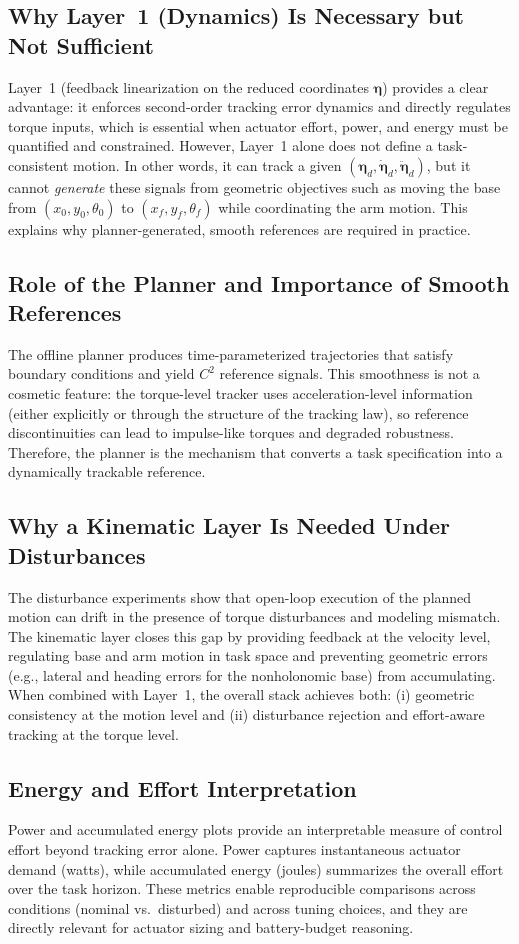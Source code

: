 \documentclass[conference]{IEEEtran}
\newcommand{\etav}{\bm{\eta}}
\newcommand{\etavdot}{\dot{\bm{\eta}}}
\newcommand{\etavddot}{\ddot{\bm{\eta}}}
\begin{document}
\subsection{Why Layer~1 (Dynamics) Is Necessary but Not Sufficient}
Layer~1 (feedback linearization on the reduced coordinates $\etav$) provides a
clear advantage: it enforces second-order tracking error dynamics and directly
regulates torque inputs, which is essential when actuator effort, power, and
energy must be quantified and constrained. However, Layer~1 alone does not
define a task-consistent motion. In other words, it can track a given
$(\etav_d,\etavdot_d,\etavddot_d)$, but it cannot \emph{generate} these signals
from geometric objectives such as moving the base from $(x_0,y_0,\theta_0)$ to
$(x_f,y_f,\theta_f)$ while coordinating the arm motion. This explains why
planner-generated, smooth references are required in practice.

\subsection{Role of the Planner and Importance of Smooth References}
The offline planner produces time-parameterized trajectories that satisfy
boundary conditions and yield $C^2$ reference signals. This smoothness is not a
cosmetic feature: the torque-level tracker uses acceleration-level information
(either explicitly or through the structure of the tracking law), so reference
discontinuities can lead to impulse-like torques and degraded robustness.
Therefore, the planner is the mechanism that converts a task specification into
a dynamically trackable reference.

\subsection{Why a Kinematic Layer Is Needed Under Disturbances}
The disturbance experiments show that open-loop execution of the planned motion
can drift in the presence of torque disturbances and modeling mismatch. The
kinematic layer closes this gap by providing feedback at the velocity level,
regulating base and arm motion in task space and preventing geometric errors
(e.g., lateral and heading errors for the nonholonomic base) from accumulating.
When combined with Layer~1, the overall stack achieves both: (i) geometric
consistency at the motion level and (ii) disturbance rejection and effort-aware
tracking at the torque level.

\subsection{Energy and Effort Interpretation}
Power and accumulated energy plots provide an interpretable measure of control
effort beyond tracking error alone. Power captures instantaneous actuator demand
(watts), while accumulated energy (joules) summarizes the overall effort over
the task horizon. These metrics enable reproducible comparisons across
conditions (nominal vs.\ disturbed) and across tuning choices, and they are
directly relevant for actuator sizing and battery-budget reasoning.
\end{document}
